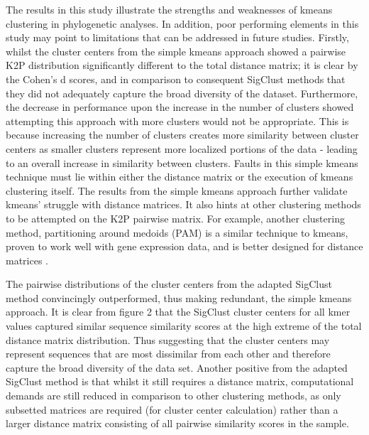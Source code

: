 \documentclass[12pt]{article}
\begin{document}
  The results in this study illustrate the strengths and weaknesses of kmeans clustering in phylogenetic analyses. In addition, poor performing elements in this study may point to limitations that can be addressed in future studies. Firstly, whilst the cluster centers from the simple kmeans approach showed a pairwise K2P distribution significantly different to the total distance matrix; it is clear by the Cohen's d scores, and in comparison to consequent SigClust methods that they did not adequately capture the broad diversity of the dataset. Furthermore, the decrease in performance upon the increase in the number of clusters showed attempting this approach with more clusters would not be appropriate. This is because increasing the number of clusters creates more similarity between cluster centers as smaller clusters represent more localized portions of the data - leading to an overall increase in similarity between clusters. Faults in this simple kmeans technique must lie within either the distance matrix or the execution of kmeans clustering itself. The results from the simple kmeans approach further validate kmeans' struggle with distance matrices. It also hints at other clustering methods to be attempted on the K2P pairwise matrix. For example, another clustering method, partitioning around medoids (PAM) is a similar technique to kmeans, proven to work well with gene expression data, and is better designed for distance matrices \cite{Huang2006}.

  The pairwise distributions of the cluster centers from the adapted SigClust method convincingly outperformed, thus making redundant, the simple kmeans approach. It is clear from figure 2 that the SigClust cluster centers for all kmer values captured similar sequence similarity scores at the high extreme of the total distance matrix distribution. Thus suggesting that the cluster centers may represent sequences that are most dissimilar from each other and therefore capture the broad diversity of the data set. Another positive from the adapted SigClust method is that whilst it still requires a distance matrix, computational demands are still reduced in comparison to other clustering methods, as only subsetted matrices are required (for cluster center calculation) rather than a larger distance matrix consisting of all pairwise similarity scores in the sample.
  
\end{document}
